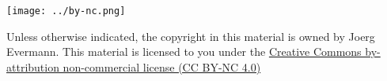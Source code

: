 \begin{center}
\texttt{[image: ../by-nc.png]}

Unless otherwise indicated, the copyright in this material is owned by Joerg Evermann. This material is licensed to you under the \href{https://creativecommons.org/licenses/by-nc/4.0/}{Creative Commons by-attribution non-commercial license (CC BY-NC 4.0)}
\end{center}
